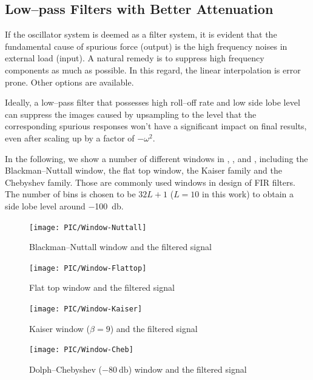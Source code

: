 \subsection{Low--pass Filters with Better Attenuation}
If the oscillator system is deemed as a filter system, it is evident that the fundamental cause of spurious force (output) is the high frequency noises in external load (input). A natural remedy is to suppress high frequency components as much as possible. In this regard, the linear interpolation is error prone. Other options are available.

Ideally, a low--pass filter that possesses high roll--off rate and low side lobe level can suppress the images caused by upsampling to the level that the corresponding spurious responses won't have a significant impact on final results, even after scaling up by a factor of $-\omega^2$.

In the following, we show a number of different windows in , ,  and , including the Blackman--Nuttall window, the flat top window, the Kaiser family and the Chebyshev family. Those are commonly used windows \citep{Oppenheim2010} in design of FIR filters. The number of bins is chosen to be $32L+1$ ($L=10$ in this work) to obtain a side lobe level around \SI{-100}{\decibel}.
\begin{figure}[htb!]
\centering
\texttt{[image: PIC/Window-Nuttall]}
\caption{Blackman--Nuttall window and the filtered signal}\label{fig:nuttall_window}
\end{figure}
\begin{figure}[htb!]
\centering
\texttt{[image: PIC/Window-Flattop]}
\caption{Flat top window and the filtered signal}\label{fig:flattop_window}
\end{figure}
\begin{figure}[htb!]
\centering
\texttt{[image: PIC/Window-Kaiser]}
\caption{Kaiser window ($\beta=9$) and the filtered signal}\label{fig:kaiser_window}
\end{figure}
\begin{figure}[htb!]
\centering
\texttt{[image: PIC/Window-Cheb]}
\caption{Dolph--Chebyshev ($\SI{-80}{\decibel}$) window and the filtered signal}\label{fig:cheb_window}
\end{figure}

